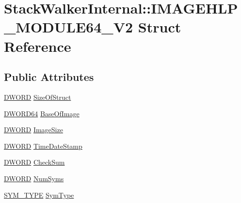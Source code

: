 \hypertarget{struct_stack_walker_internal_1_1_i_m_a_g_e_h_l_p___m_o_d_u_l_e64___v2}{\section{Stack\-Walker\-Internal\-:\-:I\-M\-A\-G\-E\-H\-L\-P\-\_\-\-M\-O\-D\-U\-L\-E64\-\_\-\-V2 Struct Reference}
\label{struct_stack_walker_internal_1_1_i_m_a_g_e_h_l_p___m_o_d_u_l_e64___v2}
}
\subsection*{Public Attributes}
\begin{DoxyCompactItemize}
\item 
\hyperlink{class_stack_walker_internal_aa02cf07e5926c7dd20d31269185c52b0}{D\-W\-O\-R\-D} \hyperlink{struct_stack_walker_internal_1_1_i_m_a_g_e_h_l_p___m_o_d_u_l_e64___v2_a5ec54a10c505b29feecaf4cda3c2872f}{Size\-Of\-Struct}
\item 
\hyperlink{_stack_walker_8h_a97fb241c597b99bcb965858f53cacac4}{D\-W\-O\-R\-D64} \hyperlink{struct_stack_walker_internal_1_1_i_m_a_g_e_h_l_p___m_o_d_u_l_e64___v2_a60fc315622bd8c38e6cb3c265002afea}{Base\-Of\-Image}
\item 
\hyperlink{class_stack_walker_internal_aa02cf07e5926c7dd20d31269185c52b0}{D\-W\-O\-R\-D} \hyperlink{struct_stack_walker_internal_1_1_i_m_a_g_e_h_l_p___m_o_d_u_l_e64___v2_a7a9c911a3c92e2ff8b05282dcc01117c}{Image\-Size}
\item 
\hyperlink{class_stack_walker_internal_aa02cf07e5926c7dd20d31269185c52b0}{D\-W\-O\-R\-D} \hyperlink{struct_stack_walker_internal_1_1_i_m_a_g_e_h_l_p___m_o_d_u_l_e64___v2_a4ad7dc3edec437aee8cdf691fbcc83fb}{Time\-Date\-Stamp}
\item 
\hyperlink{class_stack_walker_internal_aa02cf07e5926c7dd20d31269185c52b0}{D\-W\-O\-R\-D} \hyperlink{struct_stack_walker_internal_1_1_i_m_a_g_e_h_l_p___m_o_d_u_l_e64___v2_af222cd1aa79f57fdffd665cfcab94292}{Check\-Sum}
\item 
\hyperlink{class_stack_walker_internal_aa02cf07e5926c7dd20d31269185c52b0}{D\-W\-O\-R\-D} \hyperlink{struct_stack_walker_internal_1_1_i_m_a_g_e_h_l_p___m_o_d_u_l_e64___v2_ad96f9a1015fa8ec1b134871d6aea3aad}{Num\-Syms}
\item 
\hyperlink{_stack_walker_8cpp_a3ac18bf070251bbc81b0a6629840f6b6}{S\-Y\-M\-\_\-\-T\-Y\-P\-E} \hyperlink{struct_stack_walker_internal_1_1_i_m_a_g_e_h_l_p___m_o_d_u_l_e64___v2_ae095a1da6a390ef994444802cf03ebe5}{Sym\-Type}

\end{DoxyCompactItemize}

